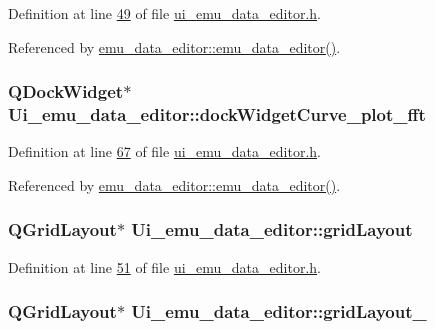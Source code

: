 Definition at line \hyperlink{a00138_source_l00049}{49} of file \hyperlink{a00138_source}{ui\+\_\+emu\+\_\+data\+\_\+editor.\+h}.



Referenced by \hyperlink{a00093_source_l00012}{emu\+\_\+data\+\_\+editor\+::emu\+\_\+data\+\_\+editor()}.

\hypertarget{a00079_a7474d72172d9e269e8f3cb22bbe2fc86}{
\subsubsection[{dock\+Widget\+Curve\+\_\+plot\+\_\+fft}]{\setlength{\rightskip}{0pt plus 5cm}Q\+Dock\+Widget$\ast$ Ui\+\_\+emu\+\_\+data\+\_\+editor\+::dock\+Widget\+Curve\+\_\+plot\+\_\+fft}}\label{a00079_a7474d72172d9e269e8f3cb22bbe2fc86}


Definition at line \hyperlink{a00138_source_l00067}{67} of file \hyperlink{a00138_source}{ui\+\_\+emu\+\_\+data\+\_\+editor.\+h}.



Referenced by \hyperlink{a00093_source_l00012}{emu\+\_\+data\+\_\+editor\+::emu\+\_\+data\+\_\+editor()}.

\hypertarget{a00079_ad06b82b83a9a74377d6ca44ae699f945}{
\subsubsection[{grid\+Layout}]{\setlength{\rightskip}{0pt plus 5cm}Q\+Grid\+Layout$\ast$ Ui\+\_\+emu\+\_\+data\+\_\+editor\+::grid\+Layout}}\label{a00079_ad06b82b83a9a74377d6ca44ae699f945}


Definition at line \hyperlink{a00138_source_l00051}{51} of file \hyperlink{a00138_source}{ui\+\_\+emu\+\_\+data\+\_\+editor.\+h}.

\hypertarget{a00079_ab6610272c6c39cba66cab113d98dcdcd}{
\subsubsection[{grid\+Layout\+\_\+2}]{\setlength{\rightskip}{0pt plus 5cm}Q\+Grid\+Layout$\ast$ Ui\+\_\+emu\+\_\+data\+\_\+editor\+::grid\+Layout\+\_}}\label{a00079_ab6610272c6c39cba66cab113d98dcdcd}


